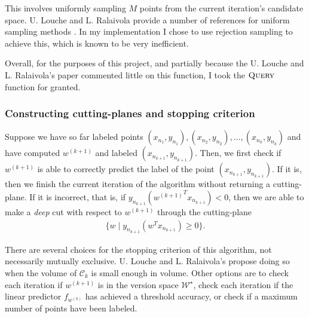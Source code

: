 \documentclass[11pt]{amsart}
\theoremstyle{definition}
\theoremstyle{remark}
\newcommand{\transpose}{T}
\begin{document}
            This involves uniformly sampling $M$ points from the current iteration's candidate space. U. Louche and L. Ralaivola provide a number of references for uniform sampling methods \cite[Section III.D]{LR15}. In my implementation I chose to use rejection sampling to achieve this, which is known to be very inefficient. 
        
            Overall, for the purposes of this project, and partially because the U. Louche and L. Ralaivola's paper \cite[Section III.D]{LR15} commented little on this function, I took the $\textsc{Query}$ function for granted. 

            \subsubsection*{Constructing cutting-planes and stopping criterion} Suppose we have so far labeled points $(x_{n_1}, y_{n_1}), (x_{n_2}, y_{n_2}), \dots, (x_{n_{k}}, y_{n_{k}})$ and have computed $w^{(k+1)}$ and labeled $(x_{n_{k+1}}, y_{n_{k+1}})$. Then, we first check if $w^{(k+1)}$ is able to correctly predict the label of the point $(x_{n_{k+1}}, y_{n_{k+1}})$. If it is, then we finish the current iteration of the algorithm without returning a cutting-plane. If it is incorrect, that is, if $y_{n_{k+1}} ({w^{(k+1)}}^\transpose x_{n_{k+1}}) < 0$, then we are able to make a \emph{deep} cut with respect to $w^{(k+1)}$ through the cutting-plane
            \begin{align*}
                \{w \;|\; y_{n_{k+1}} (w^\transpose x_{n_{k+1}}) \geq 0\}.
            \end{align*}

            There are several choices for the stopping criterion of this algorithm, not necessarily mutually exclusive. U. Louche and L. Ralaivola's \cite[Section III.D]{LR15} propose doing so when the volume of $\mathcal{C}_k$ is small enough in volume. Other options are to check each iteration if $w^{(k+1)}$ is in the version space $\mathcal{W}^\star$, check each iteration if the linear predictor $f_{w^{(k)}}$ has achieved a threshold accuracy, or check if a maximum number of points have been labeled.
\end{document}
